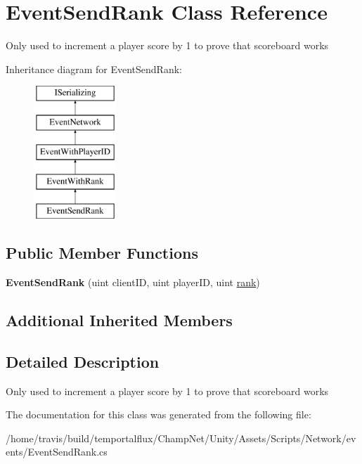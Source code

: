 \hypertarget{class_event_send_rank}{\section{Event\-Send\-Rank Class Reference}
\label{class_event_send_rank}
}


Only used to increment a player score by 1 to prove that scoreboard works  


Inheritance diagram for Event\-Send\-Rank\-:\begin{figure}[H]
\begin{center}
\leavevmode
\includegraphics[height=5.000000cm]{class_event_send_rank}
\end{center}
\end{figure}
\subsection*{Public Member Functions}
\begin{DoxyCompactItemize}
\item 
\hypertarget{class_event_send_rank_adc5770a02941af4875991acc008fa7c9}{{\bfseries Event\-Send\-Rank} (uint client\-I\-D, uint player\-I\-D, uint \hyperlink{class_event_with_rank_ab7a5557f1fe949d90945003b566d33db}{rank})}\label{class_event_send_rank_adc5770a02941af4875991acc008fa7c9}

\end{DoxyCompactItemize}
\subsection*{Additional Inherited Members}


\subsection{Detailed Description}
Only used to increment a player score by 1 to prove that scoreboard works 



The documentation for this class was generated from the following file\-:\begin{DoxyCompactItemize}
\item 
/home/travis/build/temportalflux/\-Champ\-Net/\-Unity/\-Assets/\-Scripts/\-Network/events/Event\-Send\-Rank.\-cs\end{DoxyCompactItemize}
